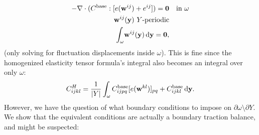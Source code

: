 \documentclass[10pt]{article}
\begin{document}
\begin{align*}
    -\nabla \cdot (C^\text{base} : [e({\bf w}^{ij}) + e^{ij}]) = {\bf 0} & \quad \text{in } \omega \\
    {\bf w}^{ij}({\bf y})\ Y \text{-periodic} & \\
    \int_\omega \! {\bf w}^{ij}({\bf y})  \, \mathrm{d} {\bf y} =  {\bf 0}, 
\end{align*}
(only solving for fluctuation displacements inside $\omega$). This is fine
since the homogenized elasticity tensor formula's integral also becomes an
integral over only $\omega$:
$$
C^H_{ijkl} = \frac{1}{|Y|} \int_\omega C_{ijpq}^\text{base} [e({\bf w}^{kl})]_{pq} + C_{ijkl}^\text{base} \, \mathrm{d} {\bf y}.
$$
However, we have the question of what boundary conditions to impose on
$\partial \omega \setminus \partial Y$. We show that the equivalent conditions
are actually a boundary traction balance, and might be suspected:
\end{document}
